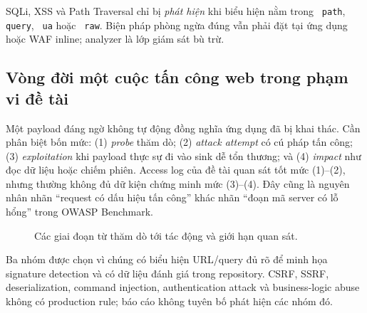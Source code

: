 \documentclass[runningheads]{report-template/llncs}
\newcommand{\code}[1]{\texttt{\small\hyphenchar\font=45 #1}}
\begin{document}
SQLi, XSS và Path Traversal chỉ bị \emph{phát hiện} khi biểu hiện nằm
trong \code{path}, \code{query}, \code{ua} hoặc \code{raw}. Biện pháp
phòng ngừa đúng vẫn phải đặt tại ứng dụng hoặc WAF inline; analyzer là
lớp giám sát bù trừ.

\subsection{Vòng đời một cuộc tấn công web trong phạm vi đề tài}

Một payload đáng ngờ không tự động đồng nghĩa ứng dụng đã bị khai thác.
Cần phân biệt bốn mức: (1) \emph{probe} thăm dò; (2) \emph{attack
attempt} có cú pháp tấn công; (3) \emph{exploitation} khi payload thực sự
đi vào sink dễ tổn thương; và (4) \emph{impact} như đọc dữ liệu hoặc chiếm
phiên. Access log của đề tài quan sát tốt mức (1)--(2), nhưng thường không
đủ dữ kiện chứng minh mức (3)--(4). Đây cũng là nguyên nhân nhãn
``request có dấu hiệu tấn công'' khác nhãn ``đoạn mã server có lỗ hổng''
trong OWASP Benchmark.

\begin{figure}[ht]
\centering
{}
\caption{Các giai đoạn từ thăm dò tới tác động và giới hạn quan sát.}
\label{fig:attack-lifecycle}
\end{figure}

Ba nhóm được chọn vì chúng có biểu hiện URL/query đủ rõ để minh họa
signature detection và có dữ liệu đánh giá trong repository. CSRF,
SSRF, deserialization, command injection, authentication attack và
business-logic abuse không có production rule; báo cáo không tuyên bố
phát hiện các nhóm đó.
\end{document}
